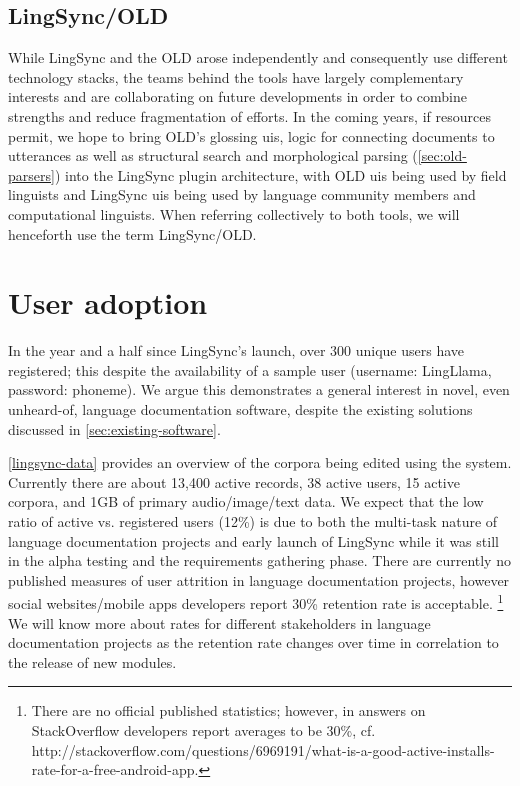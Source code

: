 \documentclass[11pt]{article}
\begin{document}
\subsection{LingSync/OLD}

While LingSync and the OLD arose independently and consequently use different
technology stacks, the teams behind the tools have largely complementary
interests and are collaborating on future developments in order to combine
strengths and reduce fragmentation of efforts. In the coming years, if resources
permit, we hope to bring OLD's glossing \glspl{ui}, logic for connecting
documents to utterances as well as structural search and morphological parsing
(\autoref{sec:old-parsers}) into the LingSync plugin architecture, with OLD
\glspl{ui} being used by field linguists and LingSync \glspl{ui} being used by
language community members and computational linguists. When referring
collectively to both tools, we will henceforth use the term LingSync/OLD.


\section{User adoption}

In the year and a half since LingSync's launch, over 300 unique users have
registered; this despite the availability of a sample user (username:
LingLlama, password: phoneme). We argue this demonstrates a general interest in
novel, even unheard-of, language documentation software, despite the existing
solutions discussed in \autoref{sec:existing-software}.

\autoref{lingsync-data} provides an overview of the corpora being edited using
the system. Currently there are about 13,400 active records, 38 active users,
15 active corpora, and 1GB of primary audio/image/text data. We expect that the
low ratio of active vs. registered users (12\%) is due to both the multi-task
nature of language documentation projects and early launch of LingSync while it
was still in the alpha testing and the requirements gathering phase.  There are currently no published measures of user
attrition in language documentation projects, however social websites/mobile
apps  developers report 30\% retention rate is acceptable.%
\footnote{There are no official published statistics; however, in answers on
    StackOverflow developers report averages to be 30\%, cf.
http://stackoverflow.com/questions/6969191/what-is-a-good-active-installs-rate-for-a-free-android-app.}
We will
know more about rates for different stakeholders in language documentation projects as the retention rate changes over time  in correlation to the
release of new modules.
\end{document}
